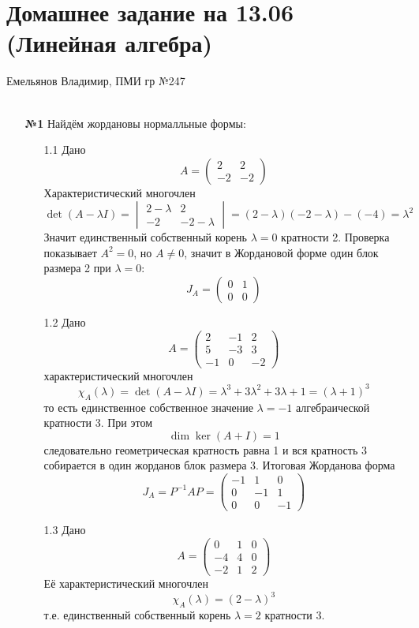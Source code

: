 \documentclass[a4paper]{article}
\begin{document}
\section*{Домашнее задание на 13.06 (Линейная алгебра)}
{\large Емельянов Владимир, ПМИ гр №247}\\\\
\begin{enumerate}
  \item[\textbf{№1}]Найдём жордановы нормалльные формы:
  \begin{enumerate}
    \item[1.1]Дано    
    $$
    A=\begin{pmatrix}2&2\\-2&-2\end{pmatrix}
    $$
    Характеристический многочлен
    $$
    \det(A-\lambda I)=\begin{vmatrix}2-\lambda&2\\-2&-2-\lambda\end{vmatrix}
    =(2-\lambda)(-2-\lambda)-(-4)=\lambda^2
    $$
    Значит единственный собственный корень $\lambda=0$ кратности 2. 
    Проверка показывает $A^2=0$, но $A\neq0$, значит в Жордановой форме 
    один блок размера 2 при $\lambda=0$:
    $$
    J_A=\begin{pmatrix}0&1\\0&0\end{pmatrix}
    $$

    \item[1.2]Дано
    $$
    A=\begin{pmatrix}
    2 & -1 & 2\\
    5 & -3 & 3\\
    -1 & 0 & -2
    \end{pmatrix}
    $$
    характеристический многочлен
    $$
    \chi_A(\lambda)=\det(A-\lambda I)=\lambda^3+3\lambda^2+3\lambda+1=(\lambda+1)^3
    $$
    то есть единственное собственное значение $\lambda=-1$ алгебраической кратности 3. 
    При этом
    $$
    \dim\ker(A+I)=1
    $$
    следовательно геометрическая кратность равна 1 и вся кратность 3 собирается
     в один жорданов блок размера 3. Итоговая Жорданова форма
    $$
    J_A=P^{-1}AP
    =\begin{pmatrix}
    -1 & 1 & 0\\
    0  & -1 & 1\\
    0  & 0  & -1
    \end{pmatrix}
    $$

    \item[1.3]Дано
    $$
    A=\begin{pmatrix}
    0&1&0\\
    -4&4&0\\
    -2&1&2
    \end{pmatrix}
    $$
    Её характеристический многочлен 
    $$\chi_A(\lambda)=(2-\lambda)^3$$
    т.е. единственный собственный корень $\lambda=2$ кратности 3.


\end{enumerate}
\end{enumerate}
\end{document}

